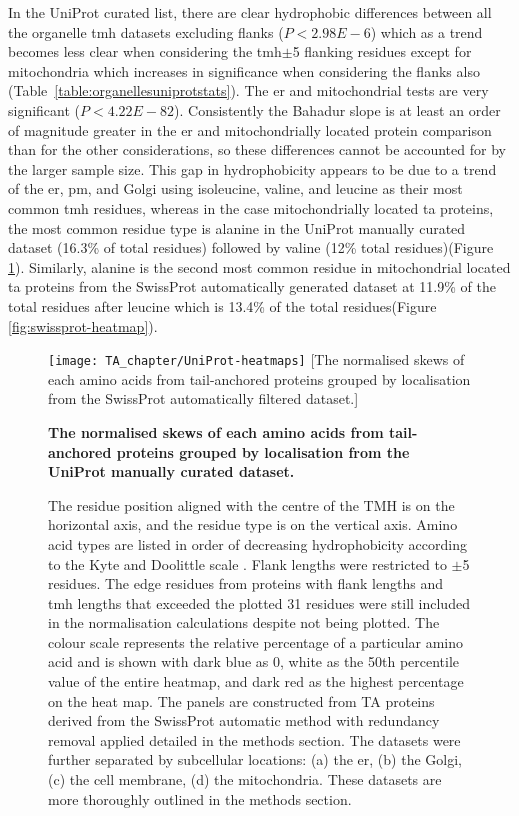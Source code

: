In the UniProt curated list, there are clear hydrophobic differences between all the organelle \gls{tmh} datasets excluding flanks ($P<2.98E-6$) which as a trend becomes less clear when considering the \gls{tmh}$\pm$5 flanking residues except for mitochondria which increases in significance when considering the flanks also (Table~\ref{table:organellesuniprotstats}).
The \gls{er} and mitochondrial tests are very significant ($P<4.22E-82$).
Consistently the Bahadur slope is at least an order of magnitude greater in the \gls{er} and mitochondrially located protein comparison than for the other considerations, so these differences cannot be accounted for by the larger sample size.
This gap in hydrophobicity appears to be due to a trend of the \gls{er}, \gls{pm}, and Golgi using isoleucine, valine, and leucine as their most common \gls{tmh} residues, whereas in the case mitochondrially located \gls{ta} proteins, the most common residue type is alanine in the UniProt manually curated dataset (16.3\% of total residues) followed by valine (12\% total residues)(Figure \ref{fig:uniprot-heatmap}).
Similarly, alanine is the second most common residue in mitochondrial located \gls{ta} proteins from the SwissProt automatically generated dataset at 11.9\% of the total residues after leucine which is 13.4\% of the total residues(Figure \ref{fig:swissprot-heatmap}).

\begin{figure}
\centering
\texttt{[image: TA\_chapter/UniProt-heatmaps]}
[The normalised skews of each amino acids from tail\--anchored proteins grouped by localisation from the SwissProt automatically filtered dataset.]
{\textbf{The normalised skews of each amino acids from tail\--anchored proteins grouped by localisation from the UniProt manually curated dataset.}

The residue position aligned with the centre of the TMH is on the horizontal axis, and the residue type is on the vertical axis.
Amino acid types are listed in order of decreasing hydrophobicity according to the Kyte and Doolittle scale \cite{Kyte1982}.
Flank lengths were restricted to $\pm$5 residues.
The edge residues from proteins with flank lengths and \gls{tmh} lengths that exceeded the plotted 31 residues were still included in the normalisation calculations despite not being plotted.
The colour scale represents the relative percentage of a particular amino acid and is shown with dark blue as 0, white as the 50th percentile value of the entire heatmap, and dark red as the highest percentage on the heat map.
The panels are constructed from TA proteins derived from the SwissProt automatic method with redundancy removal applied detailed in the methods section.
The datasets were further separated by subcellular locations: (a) the \gls{er}, (b) the Golgi, (c) the cell membrane, (d) the mitochondria.
These datasets are more thoroughly outlined in the methods section.
}

\label{fig:uniprot-heatmap}
\end{figure}

